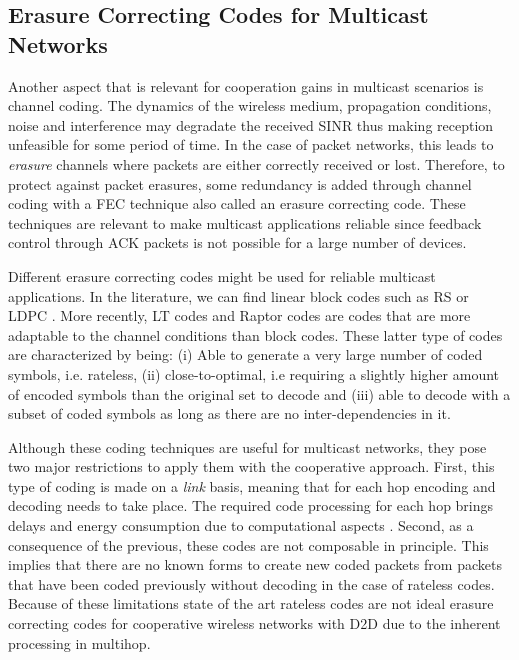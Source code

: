 \subsection{Erasure Correcting Codes for Multicast Networks}
\label{sec:erasure_codes}
Another aspect that is relevant for cooperation gains in multicast scenarios is channel coding. The dynamics of the wireless medium, propagation conditions, noise and interference may degradate the received \ac{SINR} thus making reception unfeasible for some period of time. In the case of packet networks, this leads to \textit{erasure} channels where packets are either correctly received or lost. Therefore, to protect against packet erasures, some redundancy is added through channel coding with a \ac{FEC} technique also called an erasure correcting code. These techniques are relevant to make multicast applications reliable since feedback control through \ac{ACK} packets is not possible for a large number of devices.

Different erasure correcting codes might be used for reliable multicast applications. In the literature, we can find linear block codes such as \ac{RS} \cite{reed1960polynomial} or \ac{LDPC} \cite{gallager1962low}. More recently, \ac{LT} codes \cite{luby2002lt} and Raptor codes \cite{shokrollahi2006raptor} are codes that are more adaptable to the channel conditions than block codes. These latter type of codes are characterized by being: (i) Able to generate a very large number of coded symbols, i.e. rateless, (ii) close-to-optimal, i.e requiring a slightly higher amount of encoded symbols than the original set to decode and (iii) able to decode with a subset of coded symbols as long as there are no inter-dependencies in it.

Although these coding techniques are useful for multicast networks, they pose two major restrictions to apply them with the cooperative approach. First, this type of coding is made on a \textit{link} basis, meaning that for each hop encoding and decoding needs to take place. The required code processing for each hop brings delays and energy consumption due to computational aspects \cite{toemoeskoezi2015packet}. Second, as a consequence of the previous, these codes are not composable in principle. This implies that there are no known forms to create new coded packets from packets that have been coded previously without decoding in the case of rateless codes. Because of these limitations state of the art rateless codes are not ideal erasure correcting codes for cooperative wireless networks with \ac{D2D} due to the inherent processing in multihop.

